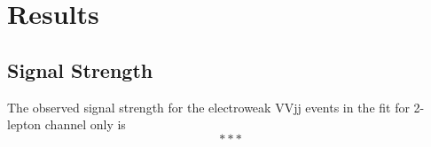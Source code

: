 \section{Results}
\subsection{Signal Strength}
The observed signal strength for the electroweak VVjj events in the fit for 2-lepton channel only is
\begin{equation}
***
\end{equation}
